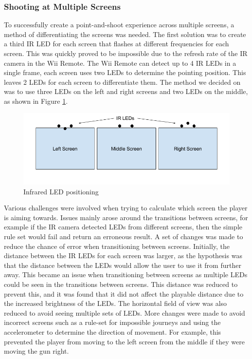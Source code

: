 \documentclass[a4paper,11pt]{article}
\begin{document}
\subsubsection{Shooting at Multiple Screens}
To successfully create a point-and-shoot experience across multiple screens, a method of differentiating the screens was needed. The first solution was to create a third IR LED for each screen that flashes at different frequencies for each screen. This was quickly proved to be impossible due to the refresh rate of the IR camera in the Wii Remote. The Wii Remote can detect up to 4 IR LEDs in a single frame, each screen uses two LEDs to determine the pointing position. This leaves 2 LEDs for each screen to differentiate them. The method we decided on was to use three LEDs on the left and right screens and two LEDs on the middle, as shown in Figure \ref{fig:led_pos}. 

\begin{figure}
	\centering
	\includegraphics[scale=0.5]{led_pos}
    \caption{Infrared LED positioning}
    \label{fig:led_pos}
\end{figure}

Various challenges were involved when trying to calculate which screen the player is aiming towards. Issues mainly arose around the transitions between screens, for example if the IR camera detected LEDs from different screens, then the simple rule set would fail and return an erroneous result. A set of changes was made to reduce the chance of error when transitioning between screens. Initially, the distance between the IR LEDs for each screen was larger, as the hypothesis was that the distance between the LEDs would allow the user to use it from further away. This became an issue when transitioning between screens as multiple LEDs could be seen in the transitions between screens. This distance was reduced to prevent this, and it was found that it did not affect the playable distance due to the increased brightness of the LEDs. The horizontal field of view was also reduced to avoid seeing multiple sets of LEDs. More changes were made to avoid incorrect screens such as a rule-set for impossible journeys and using the accelerometer to determine the direction of movement. For example, this prevented the player from moving to the left screen from the middle if they were moving the gun right. 
\end{document}
